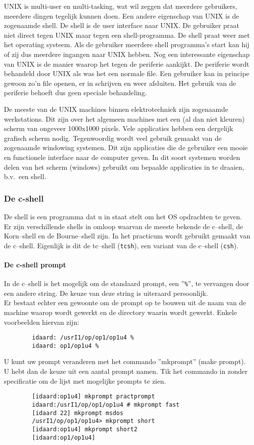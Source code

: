 UNIX is multi-user en multi-tasking, wat wil zeggen dat meerdere
gebruikers, meerdere dingen tegelijk kunnen doen. Een andere eigenschap
van UNIX is de zogenaamde shell. De shell is de user interface naar UNIX.
De gebruiker praat niet direct tegen UNIX maar tegen een shell-programma.
De shell praat weer met het operating systeem.
Als de gebruiker meerdere shell programma's start kan hij of zij
dus meerdere ingangen naar UNIX hebben.
Nog een interessante eigenschap van UNIX is de manier waarop het tegen
de periferie aankijkt. De periferie wordt behandeld door UNIX als was
het een normale file. Een gebruiker kan in principe gewoon zo'n file
openen, er in schrijven en weer afsluiten. Het gebruik van de periferie
behoeft dus geen speciale behandeling.

De meeste van de UNIX machines binnen elektrotechniek
zijn zogenaamde werkstations.
Dit zijn over het algemeen machines met een (al dan niet kleuren)
scherm van ongeveer 1000x1000 pixels.
Vele applicaties hebben een dergelijk grafisch scherm nodig.
Tegenwoordig wordt veel gebruik gemaakt van de zogenaamde windowing systemen.
Dit zijn applicaties die de gebruiker een mooie en functionele
interface naar de computer geven. In dit soort systemen worden delen van
het scherm (windows) gebruikt om bepaalde applicaties in te draaien,
b.v.\ een shell.
\subsubsection{De c-shell}
\label{De c-shell}
De shell is een programma dat u in staat stelt om het OS opdrachten
te geven.
Er zijn verschillende shells in omloop waarvan de meeste bekende
de c--shell, de Korn--shell en de Bourne--shell zijn.
In het practicum wordt gebruikt gemaakt van de c--shell.
Eigenlijk is dit de tc--shell ({\tt tcsh}),
een variant van de c--shell ({\tt csh}).
\paragraph{De c-shell prompt}
\label{De c-shell prompt}
In de c--shell is het mogelijk om de standaard prompt,
een ''{\tt \%}'', te vervangen door een andere string.
De keuze van deze string is uiteraard persoonlijk.\\
Er bestaat echter een gewoonte om de prompt op te bouwen uit
de naam van de machine waarop wordt gewerkt en de directory
waarin wordt gewerkt.
Enkele voorbeelden hiervan zijn:
\begin{verbatim}
        idaard: /usrI1/op/op1/op1u4 %
        idaard: op1/op1u4 %
\end{verbatim}
U kunt uw prompt veranderen met het commando ''mkprompt'' (make prompt).
U hebt dan de keuze uit een aantal prompt namen.
Tik het commando in zonder specificatie om de lijst met mogelijke prompts
te zien.
\begin{verbatim}
        [idaard:op1u4] mkprompt practprompt
        idaard:/usrI1/op/op1/op1u4 # mkprompt fast
        [idaard 22] mkprompt msdos
        /usrI1/op/op1/op1u4> mkprompt short
        [idaard:op1u4] mkprompt short2
        [idaard:op1/op1u4] 
\end{verbatim}
